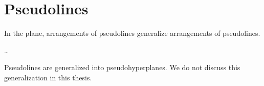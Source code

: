 \section{Pseudolines}

In the plane, arrangements of pseudolines generalize arrangements of
pseudolines.

\dots

Pseudolines are generalized into pseudohyperplanes. We do not discuss this
generalization in this thesis.
